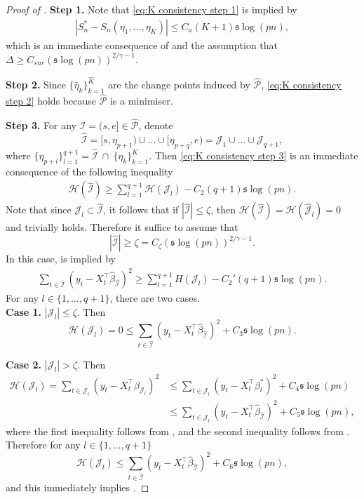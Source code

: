 \documentclass[11pt]{article}
\newcommand{\I}{{\mathcal I }}
\newcommand{\J}{{  \mathcal J } }
\newcommand{\hatp}{  {\widehat  { \mathcal P }  } }
\newcommand{\s}{ { \mathfrak{s}  } }
\theoremstyle{plain}
\theoremstyle{definition}
\begin{document}
\begin{proof}[Proof of ]
{\bf Step 1.}
Note that \eqref{eq:K consistency step 1}  is implied by 
	\begin{align}\label{eq:step 1 K consistency}  
		\left| 	S^*_n   -   S_n(\eta_1,\ldots,\eta_K)    \right| \le  C_a (K  +1) \s \log(pn)  ,
	\end{align}
	which is an immediate consequence  of  and the assumption that 
	$ \Delta \ge C_{snr}(\s\log(pn))^{2/\gamma -1 }$.  

	{\bf Step 2.}
	Since $\{ \widehat \eta_{k}\}_{k=1}^{\widehat K}$ are the change points induced by $\widehat {\mathcal P}$, \eqref{eq:K consistency step 2} holds because $\hatp$ is a minimiser.

{\bf Step 3.}
For any $\widehat \I =(s,e]\in \hatp$, denote
	\[
		\widehat \I  =  [s ,\eta_{p+1})\cup \ldots \cup  [\eta_{p+q} ,e)  = \J_1 \cup \ldots  \cup \J_{q+1},
	\]
	where $\{ \eta_{p+l}\}_{l=1}^{q+1}  =\widehat \I \ \cap \ \{\eta_k\}_{k=1}^K$. 
	Then \eqref{eq:K consistency step 3} is an immediate consequence of the following inequality
	\begin{align} \label{eq:one change point step 3 1}
		\mathcal H(\widehat \I )   \ge \sum_{l=1}^{q+1}   \mathcal  H(\J_l ) - C_2(q+1) \s\log(pn) .
	\end{align}
	Note that since $ \J_l \subset \widehat \I$, it follows that if $ |\widehat \I| \le \zeta  $, then $\mathcal H(\widehat \I ) = \mathcal H(\widehat \J_l)  =0 $ and  trivially holds. 
	Therefore it suffice to assume that 
	$$   |\widehat \I| \ge \zeta  = C_\zeta(\s\log(pn))^{2/\gamma -1}. $$
	In this case,  is implied by \begin{align} \label{eq:one change point step 3}
		\sum_{t\in \widehat \I }(y_t -X_t^{\top} \widehat \beta _{\widehat \I} )^2  \ge \sum_{l=1}^{q+1}   H(\J_l )   - C_2'(q+1) \s\log(pn) .
	\end{align}
	For any $ l\in \{ 1,\ldots, q+1\}$, there are two cases.
	\\
	{\bf Case 1.} $|\J_l|\le \zeta   $. Then 
	$$  \mathcal H(\J_l ) = 0 \le  \sum_{ t \in \widehat \I }(y_t- X_t^\top \widehat  \beta_{\widehat \I })^2 + C_3 \s\log(pn).  $$
	
	{\bf Case 2.} $|\J_l|> \zeta   $.
	Then
	\begin{align*} 
		\mathcal H(\J_l )  =   \sum_{t \in \J_l}(y_t -X_t^{\top}  \widehat \beta _{\J_l})^2 & \le   \sum_{t \in \J_l}(y_t -X_t^{\top}    \beta^*_t  )^2  +  C_4\s\log(pn)  \nonumber \\
		&    \le   \sum_{t \in \J_l}(y_t -X_t^{\top}    \widehat  \beta_{\widehat \I }   )^2  +  C_5\s\log(pn) ,
	\end{align*} 
	where  the first inequality follows from , and the second inequality follows from  .
	Therefore  for any $ l\in \{ 1,\ldots, q+1\}$ 
	$$  \mathcal H(\J_l )  \le  \sum_{ t \in \widehat \I }(y_t- X_t^\top \widehat  \beta_{\widehat \I })^2 + C_6\s\log(pn),  $$
	and this immediately implies  .


\end{proof}
\end{document}
